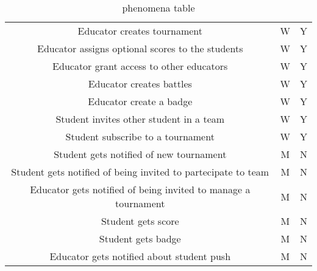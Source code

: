 \begin{center}
\begin{table}[h]
\begin{tabularx}{\textwidth}{| c| c| c|}
            Educator creates tournament                                           & W                & Y          \\
            Educator assigns optional scores to the students                      & W                & Y          \\
            Educator grant access to other educators                              & W                & Y          \\
            Educator creates battles                                              & W                & Y          \\
            Educator create a badge                                               & W                & Y          \\
            Student invites other student in a team                               & W                & Y          \\
            Student subscribe to a tournament                                     & W                & Y          \\
            Student gets notified of new tournament                               & M                & N          \\
            Student gets notified of being invited to partecipate to team         & M                & N          \\
            Educator gets notified of being invited to manage a tournament        & M                & N          \\
            Student gets score                                                    & M                & N          \\
            Student gets badge                                                    & M                & N          \\
            Educator gets notified about student push                             & M                & N          \\
            \hline
        \end{tabularx}
        \caption{phenomena table}
    \end{table}
\end{center}
